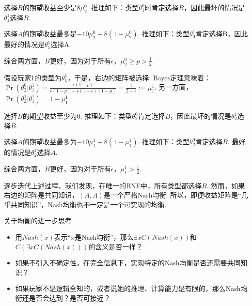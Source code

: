 选择$B$的期望收益至少是$8\mu_2^0$. 推理如下：类型$\theta_1^0$时肯定选择$B$，因此最坏的情况是$\theta_1^1$选择$B$.

选择$A$的期望收益最多是$-10\mu_2^0 + 8(1 - \mu_2^0)$. 推理如下：类型$\theta_0^1$肯定选择B，因此最好的情况是$\theta_1^1$选择A. 

综合两方面，$B$更好，因为对于所有$\epsilon$，$\mu_2^0 \geq p > \frac{1}{2}$.

假设玩家1的类型为$\theta_1^1$，于是，右边的矩阵被选择. Bayes定理意味着：$\Pr(\theta_2^0|\theta_1^1) = \frac{\epsilon(1-p)}{\epsilon(1-p)+\epsilon(1-\epsilon)(1-p)} = \frac{1}{2-\epsilon} := \mu_1^1$. 另一方面，$\Pr(\theta_2^1|\theta_1^1) = 1 - \mu_1^1$. 

选择$B$的期望收益至少为$0$. 推理如下：类型$\theta_2^0$肯定选择$B$，因此最坏的情况是$\theta_2^1$选择$B$. 

选择$A$的期望收益最多为$-10\mu_1^1 + 8(1 - \mu_1^1)$. 推理如下：类型$\theta_2^0$肯定选择$B$. 最好的情况是$\theta_2^1$选择$A$. 

综合两方面，$B$更好，因为对于所有$\epsilon$，$\mu_1^1 > \frac{1}{2}$. 

逐步迭代上述过程，我们发现，在唯一的BNE中，所有类型都选择$B$. 然而，如果右边的矩阵是共同知识，$(A,A)$是一个严格Nash均衡. 所以，即便收益矩阵是“几乎共同知识”，Nash均衡也不一定是一个可实现的均衡. 

\begin{remark}
    {关于均衡的进一步思考}
\begin{itemize}
    \item 用$Nash(x)$表示“$x$是Nash均衡”，那么$\exists x C(Nash(x))$和$C(\exists x C(Nash(x)))$的含义是否一样？
    \item 如果不引入不确定性，在完全信息下，实现特定的Nash均衡是否还需要共同知识？
    \item 如果玩家不是逻辑全知的，或者说她的推理、计算能力是有限的，那么Nash均衡还是否会达到？是否可接近？
\end{itemize}

\end{remark}


\endgroup